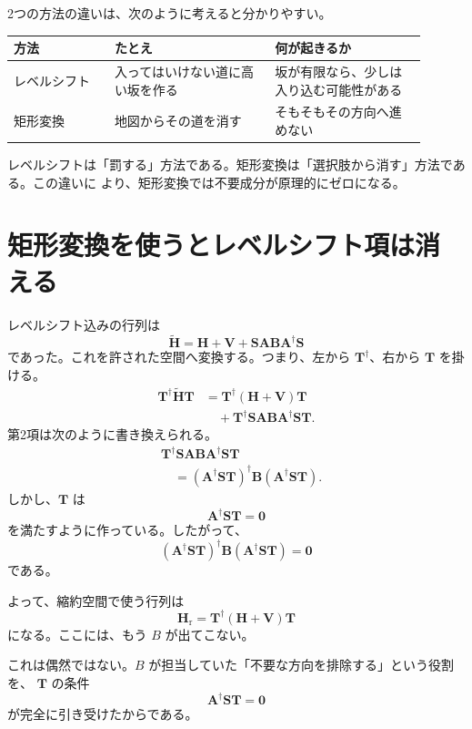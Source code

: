 \documentclass[uplatex,dvipdfmx,11pt]{jsarticle}
\newcommand{\Hcore}{\mathbf H}
\newcommand{\Venv}{\mathbf V}
\newcommand{\Smat}{\mathbf S}
\newcommand{\Amat}{\mathbf A}
\newcommand{\Bmat}{\mathbf B}
\newcommand{\Tmat}{\mathbf T}
\begin{document}
2つの方法の違いは、次のように考えると分かりやすい。

\begin{center}
\begin{tabular}{|p{0.22\linewidth}|p{0.35\linewidth}|p{0.33\linewidth}|}
\hline
\textbf{方法} & \textbf{たとえ} & \textbf{何が起きるか} \\
\hline
レベルシフト & 入ってはいけない道に高い坂を作る & 坂が有限なら、少しは入り込む可能性がある \\
\hline
矩形変換 & 地図からその道を消す & そもそもその方向へ進めない \\
\hline
\end{tabular}
\end{center}

レベルシフトは「罰する」方法である。矩形変換は「選択肢から消す」方法である。この違いに
より、矩形変換では不要成分が原理的にゼロになる。

\section{矩形変換を使うとレベルシフト項は消える}

レベルシフト込みの行列は
\[
  \widetilde{\Hcore}
  =
  \Hcore+\Venv+\Smat\Amat\Bmat\Amat^\dagger\Smat
\]
であった。これを許された空間へ変換する。つまり、左から \(\Tmat^\dagger\)、右から
\(\Tmat\) を掛ける。
\begin{align*}
\Tmat^\dagger\widetilde{\Hcore}\Tmat
&=
\Tmat^\dagger(\Hcore+\Venv)\Tmat \\
&\quad+
\Tmat^\dagger\Smat\Amat\Bmat\Amat^\dagger\Smat\Tmat .
\end{align*}
第2項は次のように書き換えられる。
\begin{align*}
&\Tmat^\dagger\Smat\Amat\Bmat\Amat^\dagger\Smat\Tmat \\
&\quad=
(\Amat^\dagger\Smat\Tmat)^\dagger
\Bmat
(\Amat^\dagger\Smat\Tmat).
\end{align*}
しかし、\(\Tmat\) は
\[
  \Amat^\dagger\Smat\Tmat=\mathbf 0
\]
を満たすように作っている。したがって、
\[
  (\Amat^\dagger\Smat\Tmat)^\dagger
  \Bmat
  (\Amat^\dagger\Smat\Tmat)
  =
  \mathbf 0
\]
である。

よって、縮約空間で使う行列は
\[
  \boxed{
  \mathbf H_{\mathrm r}
  =
  \Tmat^\dagger(\Hcore+\Venv)\Tmat
  }
\]
になる。ここには、もう \(B\) が出てこない。

これは偶然ではない。\(B\) が担当していた「不要な方向を排除する」という役割を、
\(\Tmat\) の条件
\[
  \Amat^\dagger\Smat\Tmat=\mathbf 0
\]
が完全に引き受けたからである。
\end{document}
